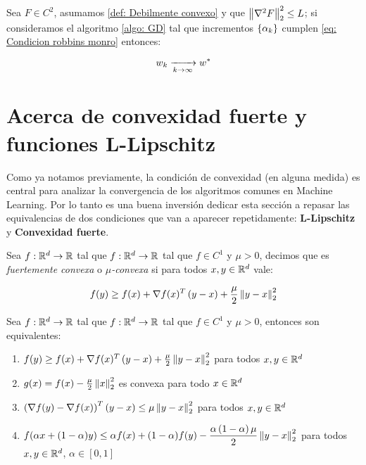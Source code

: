\begin{corollary}
	Sea $F \in C^2$, asumamos \ref{def: Debilmente convexo} y que $\left\lVert\nabla^2 F\right\rVert_2^2 \leq L$; si consideramos el algoritmo \ref{algo: GD} tal que incrementos $\left\lbrace\alpha_k\right\rbrace$  cumplen \ref{eq: Condicion robbins monro} entonces:
	
	\begin{equation}
	w_k \xrightarrow[k \rightarrow \infty]{} w^*
	\end{equation}
\end{corollary}

\section{Acerca de convexidad fuerte y funciones L-Lipschitz}

Como ya notamos previamente, la condici\'on de convexidad (en alguna medida) es central para analizar la convergencia de los algoritmos comunes en Machine Learning. Por lo tanto es una buena inversi\'on dedicar esta secci\'on a repasar las equivalencias de dos condiciones que van a aparecer repetidamente: \textbf{L-Lipschitz} y \textbf{Convexidad fuerte}.

\begin{definition}
	\label{def: Fuertemente convexa}
	Sea $f:{\mathbb{R}}^d \rightarrow {\mathbb{R}}$ tal que $f:{\mathbb{R}}^d \rightarrow {\mathbb{R}}$ tal que $f \in C^1$ y $\mu >0$, decimos que es \textit{fuertemente convexa} o $\mu$\textit{-convexa} si para todos $x,y \in {\mathbb{R}}^d$ vale:
	
	\begin{equation}
		f(y) \geq f(x) + \nabla f(x)^T\left(y-x\right) + \frac{\mu}{2} \left\lVert y-x\right\rVert_2^2
	\end{equation}
\end{definition}

\begin{proposition}
	\label{prop: equivalencias convexidad fuerte}
	Sea $f:{\mathbb{R}}^d \rightarrow {\mathbb{R}}$ tal que $f:{\mathbb{R}}^d \rightarrow {\mathbb{R}}$ tal que $f \in C^1$ y $\mu >0$, entonces son equivalentes:
	\begin{enumerate}
		\item $f(y) \geq f(x) + \nabla f(x)^T\left(y-x\right) + \frac{\mu}{2} \left\lVert y-x\right\rVert_2^2$ para todos $x,y \in {\mathbb{R}}^d$
		\item $g(x) = f(x) - \frac{\mu}{2} \left\lVert x\right\rVert_2^2$ es convexa para todo $x \in {\mathbb{R}}^d$
		\item $\left(\nabla f(y) - \nabla f(x)\right)^T \left(y-x\right) \leq \mu \left\lVert y-x\right\rVert_2^2$ para todos $x,y \in {\mathbb{R}}^d$
		\item $f(\alpha x + (1-\alpha)y) \leq \alpha f(x) + (1-\alpha) f(y) - \dfrac{\alpha \left(1 - \alpha \right) \mu}{2}\left\lVert y-x\right\rVert_2^2$ para  todos $x,y \in {\mathbb{R}}^d$, $\alpha \in [0,1]$
	\end{enumerate}
\end{proposition}

